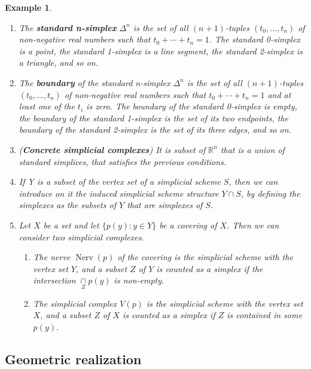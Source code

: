 \documentclass{book}
\newtheorem{example}{Example}
\begin{document}
\begin{example}
    \begin{enumerate}
        \item The \textbf{standard n-simplex} $\Delta^n$ is the set of all $(n+1)$-tuples $(t_0, \ldots, t_n)$ of non-negative real numbers such that $t_0 + \cdots + t_n = 1$. The standard 0-simplex is a point, the standard 1-simplex is a line segment, the standard 2-simplex is a triangle, and so on.

        \item The \textbf{boundary} of the standard n-simplex $\Delta^n$ is the set of all $(n+1)$-tuples $(t_0, \ldots, t_n)$ of non-negative real numbers such that $t_0 + \cdots + t_n = 1$ and at least one of the $t_i$ is zero. The boundary of the standard 0-simplex is empty, the boundary of the standard 1-simplex is the set of its two endpoints, the boundary of the standard 2-simplex is the set of its three edges, and so on.

        \item (\textbf{Concrete simplicial complexes}) It is subset of $\mathbb{R}^n$ that is a union of standard simplices, that satisfies the previous conditions.

        \item If Y is a subset of the vertex set of a simplicial scheme $S$, then we can introduce on it the induced simplicial scheme structure $ Y \cap S$, by defining the simplexes as the subsets of $ Y $ that are simplexes of $S$.  

        \item Let $X$ be a set and let $\{p(y): y \in Y\}$ be a covering of $X$. Then we can consider two simplicial complexes. 
        \begin{enumerate}
            \item The nerve $\operatorname{Nerv}(p)$ of the covering is the simplicial scheme with the vertex set $Y$, and a subset $Z$ of $Y$ is counted as a simplex if the intersection $\underset{Z}{\cap} p(y)$ is non-empty. 
            \item The simplicial complex $V(p)$ is the simplicial scheme with the vertex set $X$, and a subset $Z$ of $X$ is counted as a simplex if $Z$ is contained in some $p(y)$.
        \end{enumerate}
    \end{enumerate}
\end{example}

\subsection*{Geometric realization}
\end{document}
